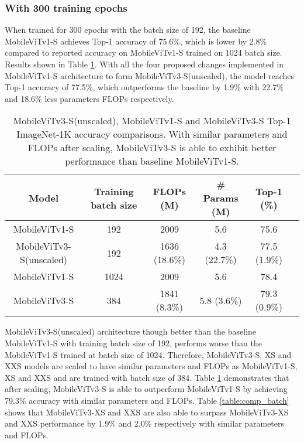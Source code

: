 \documentclass{article} \usepackage{iclr2022_conference,times}
\begin{document}
\subsubsection{With 300 training epochs}
When trained for 300 epochs with the batch size of 192, the baseline MobileViTv1-S achieves Top-1 accuracy of 75.6\%, which is lower by 2.8\% compared to reported accuracy on MobileViTv1-S trained on 1024 batch size. Results shown in Table \ref{table:300ablation}.
With all the four proposed changes implemented in MobileViTv1-S architecture to form MobileViTv3-S(unscaled), the model reaches Top-1 accuracy of 77.5\%, which outperforms the baseline by 1.9\% with 22.7\% and 18.6\% less parameters FLOPs respectively. 
 
\begin{table}[!htb]
\centering
\scriptsize
\begin{tabular}{cccccc} \toprule
    {Model} & {Training batch size} & {FLOPs (M)} & {\# Params (M)} & {Top-1 (\%)}  \\ 
    \midrule
    MobileViTv1-S  & 192  & 2009 & 5.6 & 75.6  \\
    MobileViTv3-S(unscaled)  & 192  & 1636 (18.6\%)  & 4.3 (22.7\%) & 77.5 (1.9\%)   \\
    \midrule
    MobileViTv1-S  & 1024  & 2009 & 5.6 & 78.4  \\
    MobileViTv3-S  & 384  & 1841 (8.3\%)  & 5.8 (3.6\%) & 79.3 (0.9\%)   \\
    \bottomrule
\end{tabular}
\caption{MobileViTv3-S(unscaled), MobileViTv1-S and MobileViTv3-S Top-1 ImageNet-1K accuracy comparisons. With similar parameters and FLOPs after scaling, MobileViTv3-S is able to exhibit better performance than baseline MobileViTv1-S.}
\label{table:300ablation}
\end{table}

 MobileViTv3-S(unscaled) architecture though better than the baseline MobileViTv1-S with training batch size of 192, performs worse than the MobileViTv1-S trained at batch size of 1024. 
 Therefore, MobileViTv3-S, XS and XXS models are scaled to have similar parameters and FLOPs as MobileViTv1-S, XS and XXS and are trained with batch size of 384. 
 Table \ref{table:300ablation} demonstrates that after scaling, MobileViTv3-S is able to outperform MobileViTv1-S by achieving 79.3\% accuracy with similar parameters and FLOPs.
 Table \ref{table:comp_batch} shows that MobileViTv3-XS and XXS are also able to surpass MobileViTv3-XS and XXS performance by 1.9\% and 2.0\% respectively with similar parameters and FLOPs. 
\end{document}
